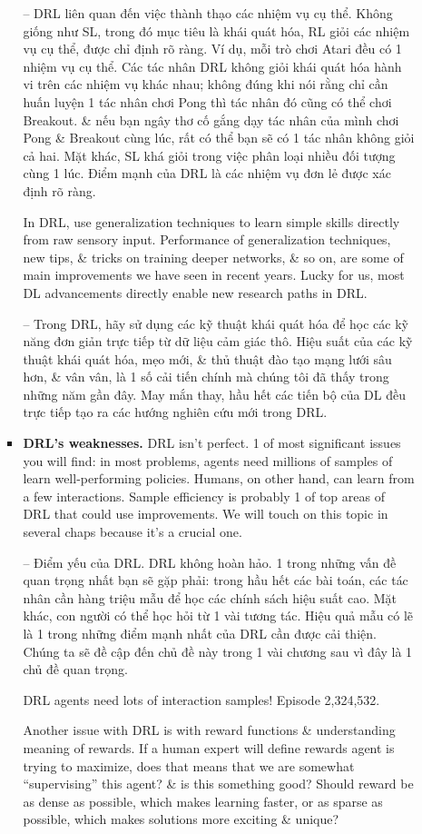 \documentclass{article}
\begin{document}
\begin{itemize}
\begin{itemize}
\begin{itemize}
            -- DRL liên quan đến việc thành thạo các nhiệm vụ cụ thể. Không giống như SL, trong đó mục tiêu là khái quát hóa, RL giỏi các nhiệm vụ cụ thể, được chỉ định rõ ràng. Ví dụ, mỗi trò chơi Atari đều có 1 nhiệm vụ cụ thể. Các tác nhân DRL không giỏi khái quát hóa hành vi trên các nhiệm vụ khác nhau; không đúng khi nói rằng chỉ cần huấn luyện 1 tác nhân chơi Pong thì tác nhân đó cũng có thể chơi Breakout. \& nếu bạn ngây thơ cố gắng dạy tác nhân của mình chơi Pong \& Breakout cùng lúc, rất có thể bạn sẽ có 1 tác nhân không giỏi cả hai. Mặt khác, SL khá giỏi trong việc phân loại nhiều đối tượng cùng 1 lúc. Điểm mạnh của DRL là các nhiệm vụ đơn lẻ được xác định rõ ràng.

            In DRL, use generalization techniques to learn simple skills directly from raw sensory input. Performance of generalization techniques, new tips, \& tricks on training deeper networks, \& so on, are some of main improvements we have seen in recent years. Lucky for us, most DL advancements directly enable new research paths in DRL.

            -- Trong DRL, hãy sử dụng các kỹ thuật khái quát hóa để học các kỹ năng đơn giản trực tiếp từ dữ liệu cảm giác thô. Hiệu suất của các kỹ thuật khái quát hóa, mẹo mới, \& thủ thuật đào tạo mạng lưới sâu hơn, \& vân vân, là 1 số cải tiến chính mà chúng tôi đã thấy trong những năm gần đây. May mắn thay, hầu hết các tiến bộ của DL đều trực tiếp tạo ra các hướng nghiên cứu mới trong DRL.
            \item {\bf DRL's weaknesses.} DRL isn't perfect. 1 of most significant issues you will find: in most problems, agents need millions of samples of learn well-performing policies. Humans, on other hand, can learn from a few interactions. Sample efficiency is probably 1 of top areas of DRL that could use improvements. We will touch on this topic in several chaps because it's a crucial one.

            -- {\sf Điểm yếu của DRL.} DRL không hoàn hảo. 1 trong những vấn đề quan trọng nhất bạn sẽ gặp phải: trong hầu hết các bài toán, các tác nhân cần hàng triệu mẫu để học các chính sách hiệu suất cao. Mặt khác, con người có thể học hỏi từ 1 vài tương tác. Hiệu quả mẫu có lẽ là 1 trong những điểm mạnh nhất của DRL cần được cải thiện. Chúng ta sẽ đề cập đến chủ đề này trong 1 vài chương sau vì đây là 1 chủ đề quan trọng.

            {\sf DRL agents need lots of interaction samples!} Episode 2,324,532.

            Another issue with DRL is with reward functions \& understanding meaning of rewards. If a human expert will define rewards agent is trying to maximize, does that means that we are somewhat ``supervising'' this agent? \& is this something good? Should reward be as dense as possible, which makes learning faster, or as sparse as possible, which makes solutions more exciting \& unique?


\end{itemize}
\end{itemize}
\end{itemize}
\end{document}

